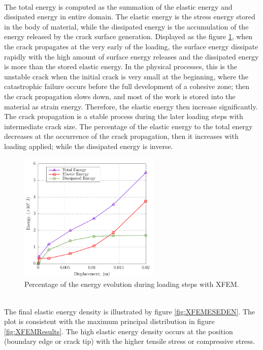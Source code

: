 \documentclass[preprint,review,12pt]{elsarticle}
\begin{document}
\
\\
The total energy is computed as the summation of the elastic energy and dissipated energy in entire domain. The elastic energy is the stress energy stored in the body of material, while the dissipated energy is the accumulation of the energy released by the crack surface generation. Displayed as the figure \ref{fig:XFEMEnergy}, when the crack propagates at the very early of the loading, the surface energy dissipate rapidly with the high amount of surface energy releases and the dissipated energy is more than the stored elastic energy. In the physical processes, this is the unstable crack when the initial crack is very small at the beginning, where the catastrophic failure occurs before the full development of a cohesive zone; then the crack propagation slows down, and most of the work is stored into the material as strain energy. Therefore, the elastic energy then increase significantly. The crack propagation is a stable process during the later loading steps with intermediate crack size. The percentage of the elastic energy to the total energy decreases at the occurrence of the crack propagation, then it increases with loading applied; while the dissipated energy is inverse.
\
\\
\begin{figure}[htbp]
   \centering
  \includegraphics[width=0.6\textwidth]{Abaqus/Energy/plot_XFEM_Energy.pdf}
   \caption{Percentage of the energy evolution during loading steps with XFEM. }
   \label{fig:XFEMEnergy}
\end{figure}
\
\\
The final elastic energy density is illustrated by figure \ref{fig:XFEMESEDEN}. The plot is consistent with the maximum principal distribution in figure \ref{fig:XFEMResults}. The high elastic energy density occurs at the position (boundary edge or crack tip) with the higher tensile stress or compressive stress.
\end{document}
